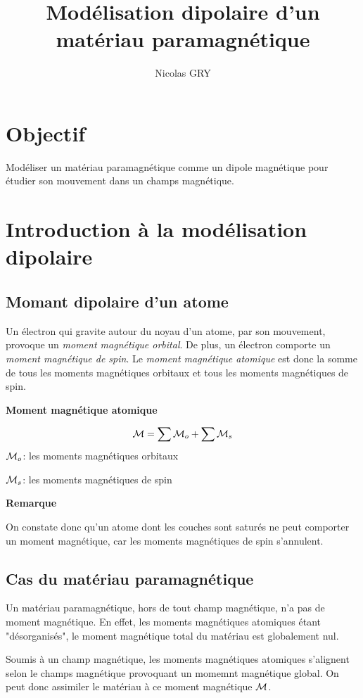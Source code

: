 \documentclass{article}
\author{Nicolas GRY}
\title{Modélisation dipolaire d'un matériau paramagnétique}
\begin{document}
\maketitle
\section{Objectif}
Modéliser un matériau paramagnétique comme un dipole magnétique pour étudier son mouvement dans un champs magnétique.

\section{Introduction à la modélisation dipolaire}
\subsection{Momant dipolaire d'un atome}
Un électron qui gravite autour du noyau d'un atome, par son mouvement, provoque un \emph{moment magnétique orbital}. De plus, un électron comporte un \emph{moment magnétique de spin}. Le \emph{moment magnétique atomique} est donc la somme de tous les moments magnétiques orbitaux et tous les moments magnétiques de spin.

\textbf{Moment magnétique atomique}
\begin{prettybox}
\large
$$\mathcal{M} = \displaystyle \sum \mathcal{M}_{o} + \sum \mathcal{M}_{s}$$
\small 
\textbf{$\mathcal{M}_{o}$}: les moments magnétiques orbitaux

\textbf{$\mathcal{M}_{s}$}: les moments magnétiques de spin
\end{prettybox}

\normalsize

\textbf{Remarque}

On constate donc qu'un atome dont les couches sont saturés ne peut comporter un moment magnétique, car les moments magnétiques de spin s'annulent.

\subsection{Cas du matériau paramagnétique}
Un matériau paramagnétique, hors de tout champ magnétique, n'a pas de moment magnétique. En effet, les moments magnétiques atomiques étant "désorganisés", le moment magnétique total du matériau est globalement nul.

Soumis à un champ magnétique, les moments magnétiques atomiques s'alignent selon le champs magnétique provoquant un momemnt magnétique global. On peut donc assimiler le matériau à ce moment magnétique $\mathcal{M}$.
\end{document}
